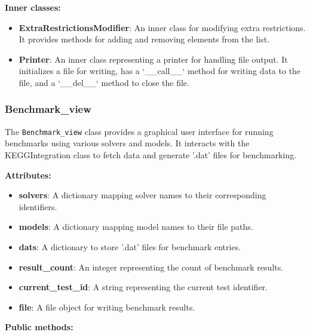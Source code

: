 \textbf {Inner classes:}

\begin{itemize}
    \item \textbf{ExtraRestrictionsModifier}: An inner class for modifying extra restrictions. It provides methods for adding and removing elements from the list.
    \item \textbf{Printer}: An inner class representing a printer for handling file output. It initializes a file for writing, has a `\_\_call\_\_` method for writing data to the file, and a `\_\_del\_\_` method to close the file.
\end{itemize}



\subsubsection{Benchmark\_view}

The \texttt{Benchmark\_view} class provides a graphical user interface for running benchmarks using various solvers and models. It interacts with the KEGGIntegration class to fetch data and generate '.dat' files for benchmarking.

\textbf{Attributes:}

\begin{itemize}
    \item \textbf{solvers}: A dictionary mapping solver names to their corresponding identifiers.
    \item \textbf{models}: A dictionary mapping model names to their file paths.
    \item \textbf{dats}: A dictionary to store '.dat' files for benchmark entries.
    \item \textbf{result\_count}: An integer representing the count of benchmark results.
    \item \textbf{current\_test\_id}: A string representing the current test identifier.
    \item \textbf{file}: A file object for writing benchmark results.
\end{itemize}

\textbf{Public methods:}

